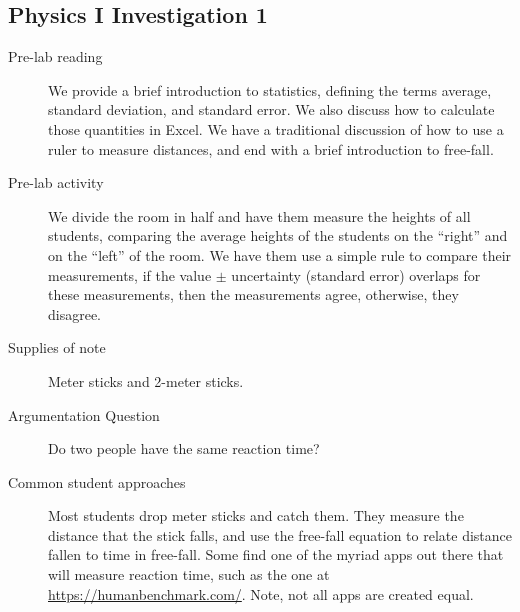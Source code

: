 \documentclass[aip, numerical, preprint]{revtex4-2}
\begin{document}
\subsection{Physics \textrm{I} Investigation 1}
\begin{description}
  \item[Pre-lab reading] We provide a brief introduction to statistics, defining the terms
  average, standard deviation, and standard error.  We also discuss how to calculate those
  quantities in Excel.  We have a traditional discussion of how to use a ruler to measure
  distances, and end with a brief introduction to free-fall.
  \item[Pre-lab activity] We divide the room in half and have them measure the heights of all
  students, comparing the average heights of the students on the ``right'' and on the ``left''
  of the room.  We have them use a simple rule to compare their measurements, if the value
  $\pm$ uncertainty (standard error) overlaps for these measurements, then the measurements
  agree, otherwise, they disagree.
  \item[Supplies of note] Meter sticks and 2-meter sticks.
  \item[Argumentation Question] Do two people have the same reaction time?
  \item[Common student approaches] Most students drop meter sticks and catch them.  They
  measure the distance that the stick falls, and use the free-fall equation to relate distance
  fallen to time in free-fall.  Some find one of the myriad apps out there that will measure
  reaction time, such as the one at \url{https://humanbenchmark.com/}.  Note, not all apps are
  created equal.  
\end{description}
\end{document}

